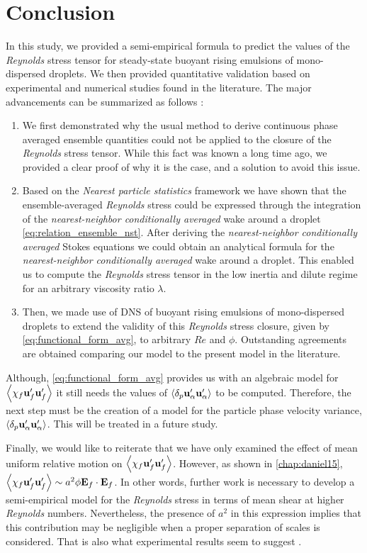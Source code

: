 \section{Conclusion}

In this study, we provided a semi-empirical formula to predict the values of the \textit{Reynolds} stress tensor for steady-state buoyant rising emulsions of mono-dispersed droplets. 
We then provided quantitative validation based on experimental and numerical studies found in the literature. 
The major advancements can be summarized as follows : 
\begin{enumerate}
    \item We first demonstrated why the usual method to derive continuous phase averaged ensemble quantities could not be applied to the closure of the \textit{Reynolds} stress tensor. 
    While this fact was known a long time ago, we provided a clear proof of why it is the case, and a solution to avoid this issue. 
    \item Based on the \textit{Nearest particle statistics} framework we have shown that the ensemble-averaged \textit{Reynolds} stress could be expressed through the integration of the \textit{nearest-neighbor conditionally averaged} wake around a droplet \eqref{eq:relation_ensemble_nst}. 
    After deriving the \textit{nearest-neighbor conditionally averaged} Stokes equations we could obtain an analytical formula for the \textit{nearest-neighbor conditionally averaged} wake around a droplet.
    This enabled us to compute the \textit{Reynolds} stress tensor in the low inertia and dilute regime for an arbitrary viscosity ratio $\lambda$. 
    \item  Then, we made use of DNS of buoyant rising emulsions of mono-dispersed droplets to extend the validity of this \textit{Reynolds} stress closure, given by \ref{eq:functional_form_avg}, to arbitrary $Re$ and $\phi$. 
    Outstanding agreements are obtained comparing our model to the present model in the literature.  
\end{enumerate}
Although, \ref{eq:functional_form_avg} provides us with an algebraic model for $\left<\chi_f \textbf{u}_f'\textbf{u}_f'\right>$ it still needs the values of $\left<\delta_p \textbf{u}_\alpha' \textbf{u}_\alpha'\right>$ to be computed. 
Therefore, the next step must be the creation of a model for the particle phase velocity variance, $\left<\delta_p \textbf{u}_\alpha' \textbf{u}_\alpha'\right>$. 
This will be treated in a future study. 

Finally, we would like to reiterate that we have only examined the effect of mean uniform relative motion on $\left<\chi_f \textbf{u}_f'\textbf{u}_f'\right>$. However, as shown in \ref{chap:daniel15}, $\left<\chi_f \textbf{u}_f'\textbf{u}_f'\right> \sim a^2\phi \textbf{E}_f \cdot \textbf{E}_f$.
In other words, further work is necessary to develop a semi-empirical model for the \textit{Reynolds} stress in terms of mean shear at higher \textit{Reynolds} numbers.
Nevertheless, the presence of $a^2$ in this expression implies that this contribution may be negligible when a proper separation of scales is considered.
That is also what experimental results seem to suggest \citet{guazzelli2011}. 